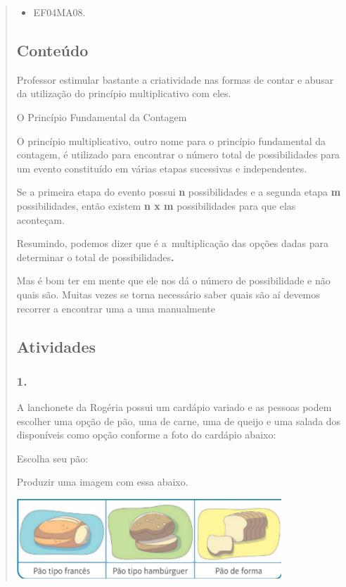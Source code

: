 \begin{enumerate}
\begin{escolha}
\begin{enumerate}
\begin{itemize}
\begin{itemize}
\begin{escolha}
\begin{quote}
\begin{escolha}
{

\begin{itemize}
\item EF04MA08.
\end{itemize}

\subsection{Conteúdo}\label{conteuxfado-10}

Professor estimular bastante a criatividade nas formas de contar e
abusar da utilização do princípio multiplicativo com eles.

O Princípio Fundamental da Contagem

O princípio multiplicativo, outro nome para o princípio fundamental da
contagem, é utilizado para encontrar o número total de possibilidades
para um evento constituído em várias etapas sucessivas e independentes.

Se a primeira etapa do evento possui \textbf{n} possibilidades e a
segunda etapa \textbf{m} possibilidades, então existem \textbf{n x m}
possibilidades para que elas aconteçam.

Resumindo, podemos dizer que é a~multiplicação das opções dadas para
determinar o total de possibilidades\textbf{.}

Mas é bom ter em mente que ele nos dá o número de possibilidade e não
quais são. Muitas vezes se torna necessário saber quais são aí devemos
recorrer a encontrar uma a uma manualmente

\subsection{Atividades}\label{atividades-10}

\subsubsection{1.}\label{section-130}

A lanchonete da Rogéria possui um cardápio variado e as pessoas podem
escolher uma opção de pão, uma de carne, uma de queijo e uma salada dos
disponíveis como opção conforme a foto do cardápio abaixo:

Escolha seu pão:

Produzir uma imagem com essa abaixo.

\includegraphics[width=3.91667in,height=1.17426in]{media/image134.png}

}
\end{escolha}
\end{quote}
\end{escolha}
\end{itemize}
\end{itemize}
\end{enumerate}
\end{escolha}
\end{enumerate}
